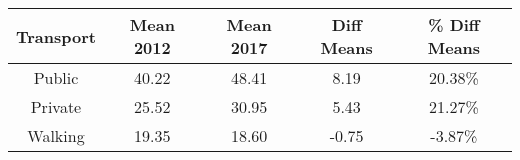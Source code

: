 \begin{table}[ht]
\centering
\begin{tabular}{ccccc}
  \hline
Transport & Mean 2012 & Mean 2017 & Diff Means & \% Diff Means \\ 
  \hline
Public & 40.22 & 48.41 & 8.19 & 20.38\% \\ 
  Private & 25.52 & 30.95 & 5.43 & 21.27\% \\ 
  Walking & 19.35 & 18.60 & -0.75 & -3.87\% \\ 
   \hline
\end{tabular}
\end{table}
